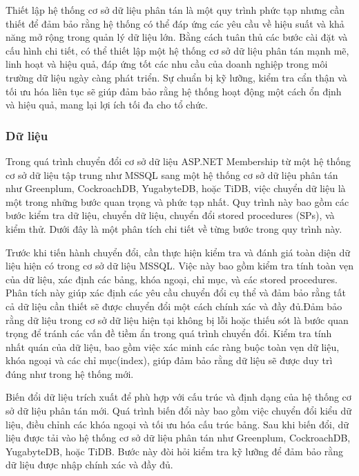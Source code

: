 \documentclass{article}[14pt]
\begin{document}
Thiết lập hệ thống cơ sở dữ liệu phân tán là một quy trình phức tạp nhưng cần thiết để đảm bảo rằng hệ thống có thể đáp ứng các yêu cầu về hiệu suất và khả năng mở rộng trong quản lý dữ liệu lớn. Bằng cách tuân thủ các bước cài đặt và cấu hình chi tiết, có thể thiết lập một hệ thống cơ sở dữ liệu phân tán mạnh mẽ, linh hoạt và hiệu quả, đáp ứng tốt các nhu cầu của doanh nghiệp trong môi trường dữ liệu ngày càng phát triển. Sự chuẩn bị kỹ lưỡng, kiểm tra cẩn thận và tối ưu hóa liên tục sẽ giúp đảm bảo rằng hệ thống hoạt động một cách ổn định và hiệu quả, mang lại lợi ích tối đa cho tổ chức.

\subsubsection{Dữ liệu}

Trong quá trình chuyển đổi cơ sở dữ liệu ASP.NET Membership từ một hệ thống cơ sở dữ liệu tập trung như MSSQL sang một hệ thống cơ sở dữ liệu phân tán như Greenplum, CockroachDB, YugabyteDB, hoặc TiDB, việc chuyển dữ liệu là một trong những bước quan trọng và phức tạp nhất. Quy trình này bao gồm các bước kiểm tra dữ liệu, chuyển dữ liệu, chuyển đổi stored procedures (SPs), và kiểm thử. Dưới đây là một phân tích chi tiết về từng bước trong quy trình này.

Trước khi tiến hành chuyển đổi, cần thực hiện kiểm tra và đánh giá toàn diện dữ liệu hiện có trong cơ sở dữ liệu MSSQL. Việc này bao gồm kiểm tra tính toàn vẹn của dữ liệu, xác định các bảng, khóa ngoại, chỉ mục, và các stored procedures. Phân tích này giúp xác định các yêu cầu chuyển đổi cụ thể và đảm bảo rằng tất cả dữ liệu cần thiết sẽ được chuyển đổi một cách chính xác và đầy đủ.Đảm bảo rằng dữ liệu trong cơ sở dữ liệu hiện tại không bị lỗi hoặc thiếu sót là bước quan trọng để tránh các vấn đề tiềm ẩn trong quá trình chuyển đổi. Kiểm tra tính nhất quán của dữ liệu, bao gồm việc xác minh các ràng buộc toàn vẹn dữ liệu, khóa ngoại và các chỉ mục(index), giúp đảm bảo rằng dữ liệu sẽ được duy trì đúng như trong hệ thống mới.


Biến đổi dữ liệu trích xuất để phù hợp với cấu trúc và định dạng của hệ thống cơ sở dữ liệu phân tán mới. Quá trình biến đổi này bao gồm việc chuyển đổi kiểu dữ liệu, điều chỉnh các khóa ngoại và tối ưu hóa cấu trúc bảng. Sau khi biến đổi, dữ liệu được tải vào hệ thống cơ sở dữ liệu phân tán như Greenplum, CockroachDB, YugabyteDB, hoặc TiDB. Bước này đòi hỏi kiểm tra kỹ lưỡng để đảm bảo rằng dữ liệu được nhập chính xác và đầy đủ.
\end{document}
